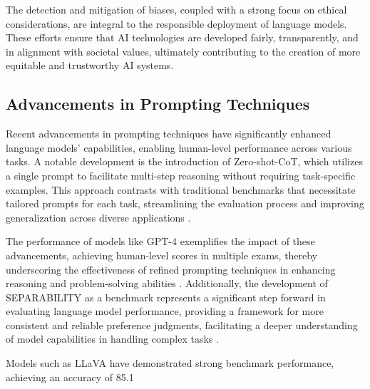 The detection and mitigation of biases, coupled with a strong focus on ethical considerations, are integral to the responsible deployment of language models. These efforts ensure that AI technologies are developed fairly, transparently, and in alignment with societal values, ultimately contributing to the creation of more equitable and trustworthy AI systems.

\subsection{Advancements in Prompting Techniques} \label{subsec:Advancements in Prompting Techniques}

Recent advancements in prompting techniques have significantly enhanced language models' capabilities, enabling human-level performance across various tasks. A notable development is the introduction of Zero-shot-CoT, which utilizes a single prompt to facilitate multi-step reasoning without requiring task-specific examples. This approach contrasts with traditional benchmarks that necessitate tailored prompts for each task, streamlining the evaluation process and improving generalization across diverse applications \cite{kojima2022large}.

The performance of models like GPT-4 exemplifies the impact of these advancements, achieving human-level scores in multiple exams, thereby underscoring the effectiveness of refined prompting techniques in enhancing reasoning and problem-solving abilities \cite{GPT-4Techn0}. Additionally, the development of SEPARABILITY as a benchmark represents a significant step forward in evaluating language model performance, providing a framework for more consistent and reliable preference judgments, facilitating a deeper understanding of model capabilities in handling complex tasks \cite{ghosh2024comparedespairreliablepreference}.

Models such as LLaVA have demonstrated strong benchmark performance, achieving an accuracy of 85.1%









